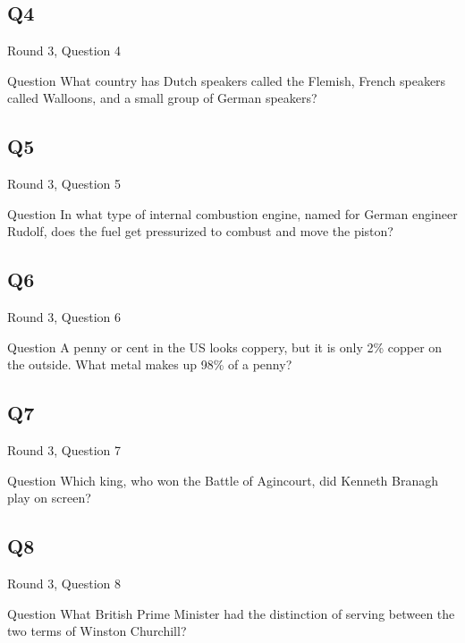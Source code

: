 \documentclass[11pt]{beamer}
\begin{document}
\subsection*{Q4}
\begin{frame}[t]{Round 3, Question 4}
\vspace{2em}
\begin{block}{Question}
What country has Dutch speakers called the Flemish, French speakers called Walloons, and a small group of German speakers\@?
\end{block}
\end{frame}
    

\subsection*{Q5}
\begin{frame}[t]{Round 3, Question 5}
\vspace{2em}
\begin{block}{Question}
In what type of internal combustion engine, named for German engineer Rudolf, does the fuel get pressurized to combust and move the piston\@?
\end{block}
\end{frame}
    

\subsection*{Q6}
\begin{frame}[t]{Round 3, Question 6}
\vspace{2em}
\begin{block}{Question}
A penny or cent in the US looks coppery, but it is only 2\% copper on the outside. What metal makes up 98\% of a penny\@?
\end{block}
\end{frame}
    

\subsection*{Q7}
\begin{frame}[t]{Round 3, Question 7}
\vspace{2em}
\begin{block}{Question}
Which king, who won the Battle of Agincourt, did Kenneth Branagh play on screen\@?
\end{block}
\end{frame}
    

\subsection*{Q8}
\begin{frame}[t]{Round 3, Question 8}
\vspace{2em}
\begin{block}{Question}
What British Prime Minister had the distinction of serving between the two terms of Winston Churchill\@?
\end{block}
\end{frame}
    
\end{document}
